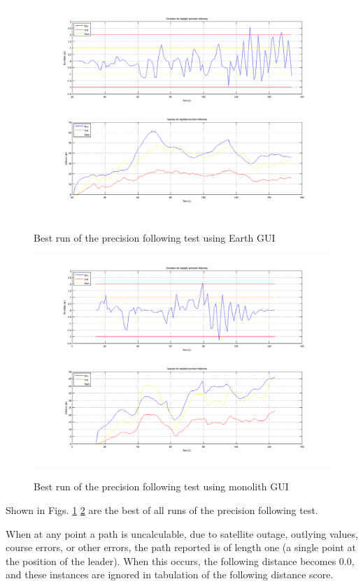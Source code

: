 \begin{figure}[ht] \centering \label{fig:precisionresults_earth}
    \includegraphics[width=5in]{./figs/dst_dev_earth_tracklap.png}
    \caption{Best run of the precision following test using Earth GUI}
\end{figure}

\begin{figure}[ht] \centering \label{fig:precisionresults_monolith}
    \includegraphics[width=5in]{./figs/dst_dev_monolith_tracklap.png}
    \caption{Best run of the precision following test using monolith GUI}
\end{figure}

Shown in Figs. \ref{fig:precisionresults_earth} \ref{fig:precisionresults_monolith} are the best of all runs of the precision following test. 

When at any point a path is uncalculable, due to satellite outage, outlying values, course errors, or other errors, the path reported is of length one (a single point at the position of the leader). When this occurs, the following distance becomes 0.0, and these instances are ignored in tabulation of the following distance score.

